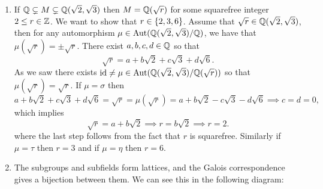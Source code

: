 \documentclass[11pt,a4paper]{article}
\begin{document}
\begin{example}
\begin{enumerate}
      \[
        \Aut(\Q(\sqrt 2,\sqrt 3) / \Q) =
        \langle \sigma \rangle \dot{\times}
        \langle \tau \rangle \cong C_2 \times C_2.
      \]
    \item[(IV)] If $\mathbb{Q} \subsetneq M \subsetneq \mathbb{Q}(\sqrt 2, \sqrt 3)$
      then $M = \mathbb{Q}(\sqrt r)$ for some squarefree integer $2 \le r \in \mathbb{Z}$.
      We want to show that $r \in \left\{2,3,6\right\}$.
      Assume that $\sqrt r \in \mathbb{Q}(\sqrt 2, \sqrt 3)$,
      then for any automorphism $\mu \in \operatorname{Aut}(\mathbb{Q}(\sqrt 2, \sqrt 3) / \mathbb{Q})$,
      we have that $\mu(\sqrt r) = \pm \sqrt r$.
      There exist $a,b,c,d \in \mathbb{Q}$ so that
      \[
        \sqrt r = a + b\sqrt 2 + c\sqrt 3 + d\sqrt 6.
      \]
      As we saw there exists
      $\operatorname{id} \neq \mu \in \operatorname{Aut}(\mathbb{Q}(\sqrt 2, \sqrt 3) / \mathbb{Q}(\sqrt r))$ so that
      $\mu(\sqrt r) = \sqrt r$.
      If $\mu = \sigma$ then
      \[
        a + b\sqrt 2 + c\sqrt 3 + d\sqrt 6 =
        \sqrt r =
        \mu(\sqrt r) =
        a + b\sqrt 2 - c\sqrt 3 - d\sqrt 6 \implies c = d = 0,
      \]
      which implies
      \[
        \sqrt r = a + b\sqrt 2 \implies r = b\sqrt 2 \implies r = 2.
      \]
      where the last step follows from the fact that $r$ is squarefree.
      Similarly if $\mu = \tau$ then $r = 3$ and if
      $\mu = \eta$ then $r = 6$.
      \item[(V)] The subgroups and subfields form lattices, and the Galois
        correspondence gives a bijection between them.
        We can see this in the following diagram:
        \begin{center}
\end{center}
\end{enumerate}
\end{example}
\end{document}
